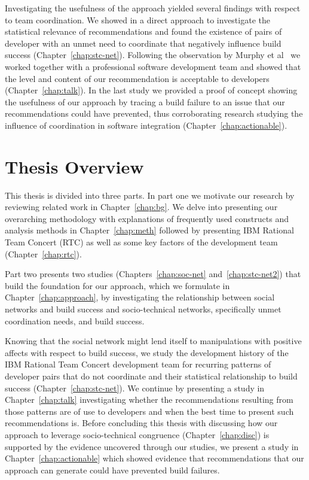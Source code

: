 Investigating the usefulness of the approach yielded several findings with respect to team coordination.
We showed in a direct approach to investigate the statistical relevance of recommendations and found the existence of pairs of developer with an unmet need to coordinate that negatively influence build success (Chapter~\ref{chap:stc-net}).
Following the observation by Murphy et al~\cite{murphy:rsse:2010} we worked together with a professional software development team and showed that the level and content of our recommendation is acceptable to developers (Chapter~\ref{chap:talk}).
In the last study we provided a proof of concept showing the usefulness of our approach by tracing a build failure to an issue that our recommendations could have prevented, thus corroborating research studying the influence of coordination in software integration (Chapter~\ref{chap:actionable}).

\section{Thesis Overview}
This thesis is divided into three parts.
In part one we motivate our research by reviewing related work in Chapter~\ref{chap:bg}.
We delve into presenting our overarching methodology with explanations of frequently used constructs and analysis methods in Chapter~\ref{chap:meth} followed by presenting IBM Rational Team Concert (RTC) as well as some key factors of the development team (Chapter~\ref{chap:rtc}).

Part two presents two studies (Chapters~\ref{chap:soc-net} and~\ref{chap:stc-net2}) that build the foundation for our approach, which we formulate in Chapter~\ref{chap:approach}, by investigating the relationship between social networks and build success and socio-technical networks, specifically unmet coordination needs, and build success.

Knowing that the social network might lend itself to manipulations with positive affects with respect to build success, we study the development history of the IBM Rational Team Concert development team for recurring patterns of developer pairs that do not coordinate and their statistical relationship to build success (Chapter~\ref{chap:stc-net}).
We continue by presenting a study in Chapter~\ref{chap:talk} investigating whether the recommendations resulting from those patterns are of use to developers and when the best time to present such recommendations is.
Before concluding this thesis with discussing how our approach to leverage socio-technical congruence (Chapter~\ref{chap:disc}) is supported by the evidence uncovered through our studies, we present a study in Chapter~\ref{chap:actionable} which showed evidence that 
recommendations that our approach can generate could have prevented build failures.






















